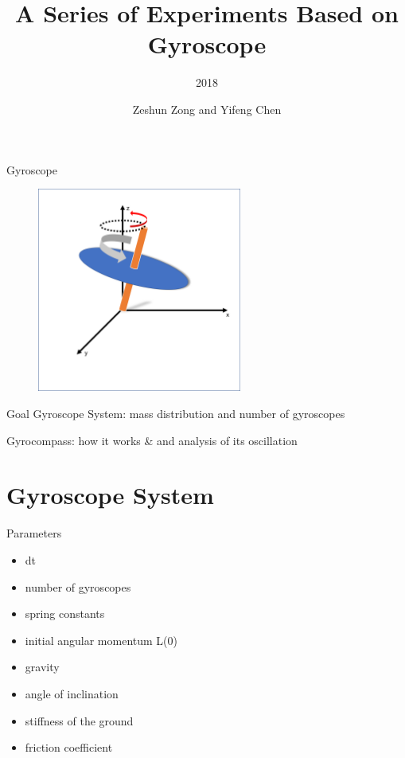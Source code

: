 \documentclass[10pt]{beamer}
\title{A Series of Experiments Based on Gyroscope}
\subtitle{2018}
\date{}
\author{Zeshun Zong and Yifeng Chen}
\institute{Courant Institute of Mathematical Sciences, New York University}
\begin{document}
\maketitle

\begin{frame}[fragile]{Gyroscope}
\begin{figure}[h]
	\centering
	\includegraphics[width=0.6\textwidth]{sphere1.png}
\end{figure}

\end{frame}

\begin{frame}{Goal}
Gyroscope System: mass distribution and number of gyroscopes

Gyrocompass: how it works \& and analysis of its oscillation

\end{frame}

\section{Gyroscope System}

\begin{frame}{Parameters}
\begin{itemize}
\item dt
\item number of gyroscopes
\item spring constants
\item initial angular momentum L(0)
\item gravity
\item angle of inclination
\item stiffness of the ground
\item friction coefficient
\end{itemize}

\end{frame}
\end{document}
